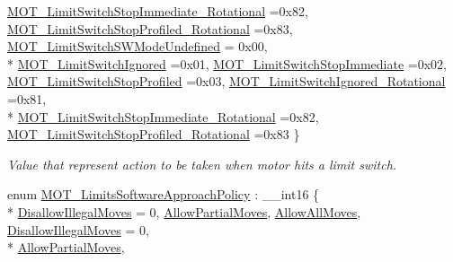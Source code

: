 \begin{DoxyCompactItemize}
\hyperlink{group___common_gga7d4db5fc799ed3fd24818bff565afd85a7bd2ef0ac74cc97d2e31566748690126}{M\+O\+T\+\_\+\+Limit\+Switch\+Stop\+Immediate\+\_\+\+Rotational} =0x82, 
\hyperlink{group___common_gga7d4db5fc799ed3fd24818bff565afd85a3becb9439f05020edc6be29dc1098773}{M\+O\+T\+\_\+\+Limit\+Switch\+Stop\+Profiled\+\_\+\+Rotational} =0x83, 
\hyperlink{group___common_gga7d4db5fc799ed3fd24818bff565afd85a4ad3d4ea235e662dc262a8590f1de2da}{M\+O\+T\+\_\+\+Limit\+Switch\+S\+W\+Mode\+Undefined} = 0x00, 
\\*
\hyperlink{group___common_gga7d4db5fc799ed3fd24818bff565afd85aa6281a52eae594413bbdd608ca38e00e}{M\+O\+T\+\_\+\+Limit\+Switch\+Ignored} =0x01, 
\hyperlink{group___common_gga7d4db5fc799ed3fd24818bff565afd85a5ad558f043ef9f21cb0d7adbbbd759a4}{M\+O\+T\+\_\+\+Limit\+Switch\+Stop\+Immediate} =0x02, 
\hyperlink{group___common_gga7d4db5fc799ed3fd24818bff565afd85ada5c4869e7fefa8f76f593d214c0c830}{M\+O\+T\+\_\+\+Limit\+Switch\+Stop\+Profiled} =0x03, 
\hyperlink{group___common_gga7d4db5fc799ed3fd24818bff565afd85a5aabe1197e36ba92db98dca8a959f243}{M\+O\+T\+\_\+\+Limit\+Switch\+Ignored\+\_\+\+Rotational} =0x81, 
\\*
\hyperlink{group___common_gga7d4db5fc799ed3fd24818bff565afd85a7bd2ef0ac74cc97d2e31566748690126}{M\+O\+T\+\_\+\+Limit\+Switch\+Stop\+Immediate\+\_\+\+Rotational} =0x82, 
\hyperlink{group___common_gga7d4db5fc799ed3fd24818bff565afd85a3becb9439f05020edc6be29dc1098773}{M\+O\+T\+\_\+\+Limit\+Switch\+Stop\+Profiled\+\_\+\+Rotational} =0x83
 \}\begin{DoxyCompactList}\small\item\em Value that represent action to be taken when motor hits a limit switch. \end{DoxyCompactList}
\item 
enum \hyperlink{group___common_gad9af9612d4e18c6cd2e7aaaedd6dc49d}{M\+O\+T\+\_\+\+Limits\+Software\+Approach\+Policy} \+: \+\_\+\+\_\+int16 \{ \\*
\hyperlink{group___common_ggad9af9612d4e18c6cd2e7aaaedd6dc49da6ec8cab62f000a14ca800c4cd71a6202}{Disallow\+Illegal\+Moves} = 0, 
\hyperlink{group___common_ggad9af9612d4e18c6cd2e7aaaedd6dc49dab58555d9b6ff3b95a59c5d5fdd085723}{Allow\+Partial\+Moves}, 
\hyperlink{group___common_ggad9af9612d4e18c6cd2e7aaaedd6dc49da9a2933f92f58ac4a4db46005cc29d7ee}{Allow\+All\+Moves}, 
\hyperlink{group___common_ggad9af9612d4e18c6cd2e7aaaedd6dc49da6ec8cab62f000a14ca800c4cd71a6202}{Disallow\+Illegal\+Moves} = 0, 
\\*
\hyperlink{group___common_ggad9af9612d4e18c6cd2e7aaaedd6dc49dab58555d9b6ff3b95a59c5d5fdd085723}{Allow\+Partial\+Moves}, 

\end{DoxyCompactItemize}
